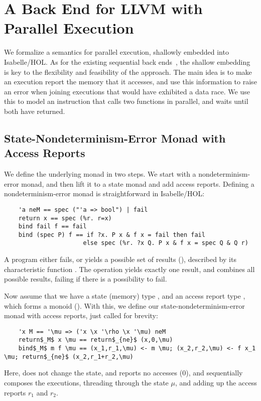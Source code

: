\documentclass[a4paper,UKenglish,cleveref, autoref, thm-restate]{lipics-v2021}
\begin{document}
\section{A Back End for LLVM with Parallel Execution}\label{sec:parsem}
  We formalize a semantics for parallel execution, shallowly embedded into Isabelle/HOL.
  As for the existing sequential back ends~\cite{La15,La19-llvm}, the shallow embedding is key
  to the flexibility and feasibility of the approach.
  The main idea is to make an execution report the memory that it accesses,
  and use this information to raise an error when joining executions that
  would have exhibited a data race. We use this to model an instruction that
  calls two functions in parallel, and waits until both have returned.

  \subsection{State-Nondeterminism-Error Monad with Access Reports}\label{sec:monad}
  We define the underlying monad in two steps. We start with a nondeterminism-error monad,
  and then lift it to a state monad and add access reports.
  Defining a nondeterminism-error monad is straightforward in Isabelle/HOL:
  \begin{lstlisting}
    'a neM == spec ("'a => bool") | fail
    return x == spec (%r. r=x)
    bind fail f == fail
    bind (spec P) f == if ?x. P x & f x = fail then fail
                      else spec (%r. ?x Q. P x & f x = spec Q & Q r)
  \end{lstlisting}
  A program either fails, or yields a possible set of results (), described by its characteristic function .
  The  operation yields exactly one result, and  combines all possible results,
  failing if there is a possibility to fail.

  Now assume that we have a state (memory) type , and an access report type , which forms a monoid ().
  With this, we define our state-nondeterminism-error monad with access reports, just called  for brevity:
  \begin{lstlisting}
    'x M == '\mu => ('x \x '\rho \x '\mu) neM
    return$_M$ x \mu == return$_{ne}$ (x,0,\mu)
    bind$_M$ m f \mu == (x_1,r_1,\mu) <- m \mu; (x_2,r_2,\mu) <- f x_1 \mu; return$_{ne}$ (x_2,r_1+r_2,\mu)
  \end{lstlisting}
  Here,  does not change the state, and reports no accesses (\is$0$),
  and  sequentially composes the executions, threading through the state $\mu$, and adding up the access reports \is$r_1$ and \is$r_2$.
\end{document}
